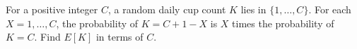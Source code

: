For a positive integer $C$, a random daily cup count $K$ lies in $\{1,\ldots,C\}$. For each $X=1,\ldots,C$, the probability of $K=C+1-X$ is $X$ times the probability of $K=C$. Find $E[K]$ in terms of $C$.
